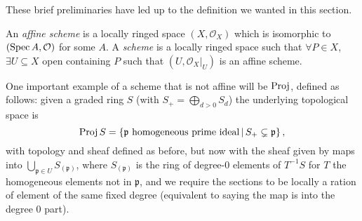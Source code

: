 \documentclass[000-main.tex]{subfiles}
\begin{document}
These brief preliminaries have led up to the definition we wanted in this section. 

\begin{definition}
  An \emph{affine scheme} is a locally ringed space $(X, \mathcal{O}_X)$ which is isomorphic to $(\operatorname{Spec} A, \mathcal{O})$ for some $A$.
  A \emph{scheme} is a locally ringed space such that $\forall P \in X$, $\exists U \subseteq X$ open containing $P$ such that $(U, \left . \mathcal{O}_X \right \rvert_{U})$ is an affine scheme.
\end{definition}

\begin{example}
\end{example}

One important example of a scheme that is not affine will be $\operatorname{Proj}$, defined as follows: given a graded ring $S$ (with $S_+ = \bigoplus_{d > 0 } S_d$) the underlying topological space is 
\[
  \operatorname{Proj} S = \left \lbrace \mathfrak{p} \text{ homogeneous prime ideal} \, | \, S_+ \subsetneq \mathfrak{p} \right \rbrace ,
\] 
with topology and sheaf defined as before, but now with the sheaf given by maps into $\bigcup_{\mathfrak{p} \in U} S_{(\mathfrak{p})}$, where $S_{(\mathfrak{p})}$ is the ring of degree-0 elements of $T^{-1}S$ for $T$ the homogeneous elements not in $\mathfrak{p}$, and we require the sections to be locally a ration of element of the same fixed degree (equivalent to saying the map is into the degree 0 part). 

\end{document}
